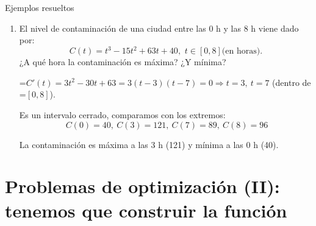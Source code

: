 \documentclass[11pt,a4paper]{article}
\newcommand{\fmm}[1]{\setbox0=\hbox{$#1$}\ifdim\wd0>\linewidth\[#1\]\else\mbox{\box0}\fi}
\begin{document}
\begin{fmex}{Ejemplos resueltos}
\begin{enumerate}[label=\textbf{\arabic*.},leftmargin=*]
Coste medio: \fmm{CM(x)=\dfrac{C(x)}{x}=x+10+\dfrac{400}{x}}, \fmm{x\gt0}.

            

\fmm{CM'(x)=1-\dfrac{400}{x^2}=0\Rightarrow x^2=400\Rightarrow x=20}

            

\fmm{CM''(x)=\dfrac{800}{x^3}\Rightarrow CM''(20)\gt0}: mínimo. \fmm{\ CM(20)=20+10+20=50}. Fabricando 20 unidades, el coste medio es mínimo: 50 € por unidad.
\item El nivel de contaminación de una ciudad entre las 0 h y las 8 h viene dado por: \[C(t)=t^3-15t^2+63t+40,\,\, t\in[0,8] \text{(en horas)}.\] ¿A qué hora la contaminación es máxima? ¿Y mínima?
          

            

\fmm{C'(t)=3t^2-30t+63=3(t-3)(t-7)=0\Rightarrow t=3,\ t=7} (dentro de \fmm{[0,8]}).

            

Es un intervalo cerrado, comparamos con los extremos:\[\ C(0)=40,\ C(3)=121,\ C(7)=89,\ C(8)=96\]

            

La contaminación es máxima a las 3 h (121) y mínima a las 0 h (40).
\end{enumerate}
\end{fmex}

  
\section{Problemas de optimización (II): tenemos que construir la función}\hypertarget{sec7}{}

  
\end{document}
